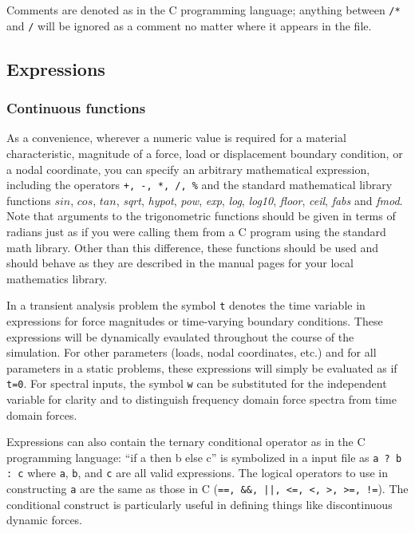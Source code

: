 Comments are denoted 
as in the C programming language; anything between {\tt /*} and {\tt */}
will be ignored as a comment no matter where it appears in the file. 

\subsection{Expressions}

\subsubsection{Continuous functions}
As a convenience, wherever a numeric value is required for a 
material characteristic, magnitude of a force, load or displacement
boundary condition, or a nodal coordinate, you 
can specify an arbitrary mathematical expression, including the operators
{\tt +, -, *, /, \%} and the 
standard mathematical library functions $sin$, $cos$, $tan$, {\em sqrt},
{\em hypot}, {\em pow}, {\em exp}, {\em log}, {\em log10},
{\em floor}, {\em ceil}, {\em fabs} and {\em fmod}.  Note that arguments
to the trigonometric functions should be given in terms of radians just as
if you were calling them from a C program using the standard math library.
Other than this difference, these functions should be used
and should behave as they are described in the manual pages for your
local mathematics library.

In a transient analysis problem the symbol {\tt t} denotes the time
variable in expressions for force magnitudes or time-varying boundary
conditions.  These expressions will
be dynamically evaulated throughout the course of the simulation.  For other
parameters (loads, nodal coordinates, etc.) and for all parameters in a static
problems, these expressions will simply be evaluated as if {\tt t=0}.
For spectral inputs, the symbol {\tt w} can be substituted for the 
independent variable for clarity and to distinguish frequency domain force
spectra from time domain forces.

Expressions can also
contain the ternary conditional operator as in the C programming language:
``if a then b else c'' is symbolized in a \felt{} input file as 
\mbox{{\tt a ? b : c}} where {\tt a}, {\tt b}, and {\tt c} are all 
valid expressions.  The logical operators to use in constructing {\tt a} are 
the same as those in C ({\tt ==, \&\&, ||, <=, <, >, >=, !=}).  
The conditional construct is particularly useful in defining things like
discontinuous dynamic forces.  

